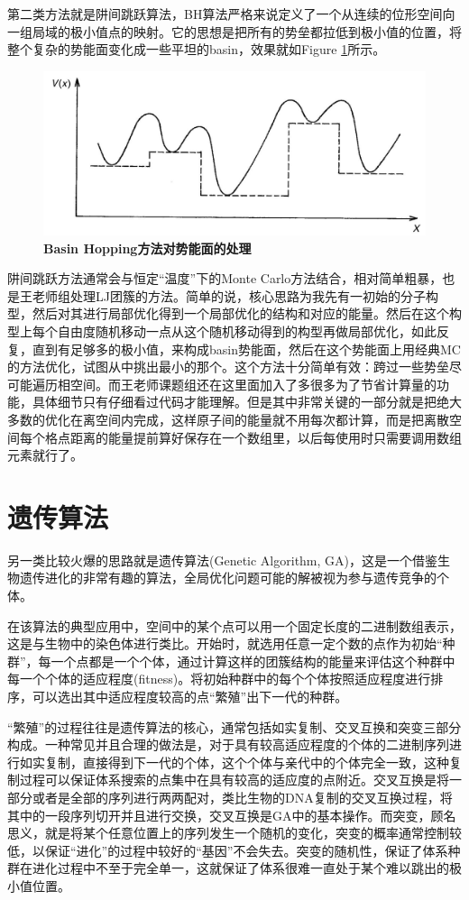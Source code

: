\documentclass[12pt,a4paper,openany,twoside]{book}
\numberwithin{equation}{section}
\begin{document}
        第二类方法就是阱间跳跃算法，BH算法严格来说定义了一个从连续的位形空间向一组局域的极小值点的映射。它的思想是把所有的势垒都拉低到极小值的位置，将整个复杂的势能面变化成一些平坦的basin，效果就如Figure \ref{BH}所示。
        \begin{figure}
          \centering
          \label{BH}
          \includegraphics[width = 12cm]{fig/BH.jpg}
          \caption{\textbf{Basin Hopping方法对势能面的处理}}
        \end{figure}
        阱间跳跃方法通常会与恒定“温度”下的Monte Carlo方法结合，相对简单粗暴，也是王老师组处理LJ团簇的方法。简单的说，核心思路为我先有一初始的分子构型，然后对其进行局部优化得到一个局部优化的结构和对应的能量。然后在这个构型上每个自由度随机移动一点从这个随机移动得到的构型再做局部优化，如此反复，直到有足够多的极小值，来构成basin势能面，然后在这个势能面上用经典MC的方法优化，试图从中挑出最小的那个。这个方法十分简单有效：跨过一些势垒尽可能遍历相空间。而王老师课题组还在这里面加入了多很多为了节省计算量的功能，具体细节只有仔细看过代码才能理解。但是其中非常关键的一部分就是把绝大多数的优化在离空间内完成，这样原子间的能量就不用每次都计算，而是把离散空间每个格点距离的能量提前算好保存在一个数组里，以后每使用时只需要调用数组元素就行了。

      \section{遗传算法}
        另一类比较火爆的思路就是遗传算法(Genetic Algorithm, GA)，这是一个借鉴生物遗传进化的非常有趣的算法，全局优化问题可能的解被视为参与遗传竞争的个体。
        
        在该算法的典型应用中，空间中的某个点可以用一个固定长度的二进制数组表示，这是与生物中的染色体进行类比。开始时，就选用任意一定个数的点作为初始“种群”，每一个点都是一个个体，通过计算这样的团簇结构的能量来评估这个种群中每一个个体的适应程度(fitness)。将初始种群中的每个个体按照适应程度进行排序，可以选出其中适应程度较高的点“繁殖”出下一代的种群。
        
        “繁殖”的过程往往是遗传算法的核心，通常包括如实复制、交叉互换和突变三部分构成。一种常见并且合理的做法是，对于具有较高适应程度的个体的二进制序列进行如实复制，直接得到下一代的个体，这个个体与亲代中的个体完全一致，这种复制过程可以保证体系搜索的点集中在具有较高的适应度的点附近。交叉互换是将一部分或者是全部的序列进行两两配对，类比生物的DNA复制的交叉互换过程，将其中的一段序列切开并且进行交换，交叉互换是GA中的基本操作。而突变，顾名思义，就是将某个任意位置上的序列发生一个随机的变化，突变的概率通常控制较低，以保证“进化”的过程中较好的“基因”不会失去。突变的随机性，保证了体系种群在进化过程中不至于完全单一，这就保证了体系很难一直处于某个难以跳出的极小值位置。
\end{document}
